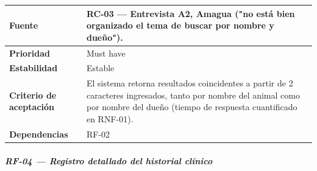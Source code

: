 \documentclass[
]{article}
\newcounter{none} %
\begin{document}
{\def\LTcaptype{none} %
\begin{longtable}[]{@{}
  >{\raggedright\arraybackslash}p{}
  >{\raggedright\arraybackslash}p{}@{}}
\toprule\noalign{}
\begin{minipage}[b]{\linewidth}\raggedright
\textbf{Fuente}
\end{minipage} & \begin{minipage}[b]{\linewidth}\raggedright
RC-03 --- Entrevista A2, Amagua ("no está bien organizado el tema de
buscar por nombre y dueño").
\end{minipage} \\
\midrule\noalign{}
\endhead
\bottomrule\noalign{}
\endlastfoot
\textbf{Prioridad} & \begin{minipage}[t]{\linewidth}\raggedright
Must have
\end{minipage} \\
\textbf{Estabilidad} & \begin{minipage}[t]{\linewidth}\raggedright
Estable
\end{minipage} \\
\textbf{Criterio de aceptación} &
\begin{minipage}[t]{\linewidth}\raggedright
El sistema retorna resultados coincidentes a partir de 2 caracteres
ingresados, tanto por nombre del animal como por nombre del dueño
(tiempo de respuesta cuantificado en RNF-01).
\end{minipage} \\
\textbf{Dependencias} & \begin{minipage}[t]{\linewidth}\raggedright
RF-02
\end{minipage} \\
\end{longtable}
}

\subparagraph{RF-04 --- Registro detallado del historial
clínico}\label{rf-04-registro-detallado-del-historial-cluxednico}
\end{document}
